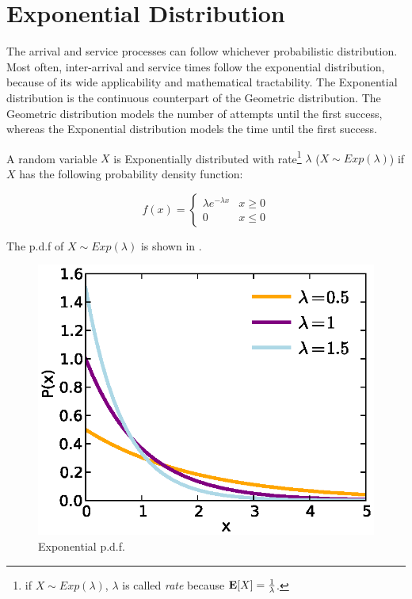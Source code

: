 \section{Exponential Distribution}
\label{sec:Exponential-Distribution}

The arrival and service processes can follow whichever probabilistic distribution. Most often, inter-arrival and service times follow the exponential distribution, because of its wide applicability and mathematical tractability.
The Exponential distribution is the continuous counterpart of the Geometric distribution. The Geometric distribution models the number of attempts until the first success, whereas the Exponential distribution models the time until the first success.

\begin{definition}
\label{def:Exponential-Distribution}	
	A random variable $X$ is Exponentially distributed with rate\footnote{if $X \sim Exp(\lambda)$, $\lambda$ is called \textit{rate} because $\mathbf{E}[X]=\frac{1}{\lambda}$.} $\lambda$ ($X \sim Exp(\lambda)$) if $X$ has the following probability density function:
	
	\begin{equation}
	\label{eqn:Exponential-PDF}
	f(x) = \left\{\begin{matrix}
		\lambda e^{-\lambda x} & x \geq 0\\ 
		0 & x \leq 0
	\end{matrix}\right.
	\end{equation}
\end{definition}

The p.d.f of $X \sim Exp(\lambda)$ is shown in .

\begin{figure}[tp]
\label{fig:Exponential-PDF}	
	\centering
	\includegraphics{fig/exponential-pdf}
	\caption{Exponential p.d.f.}
\end{figure}

